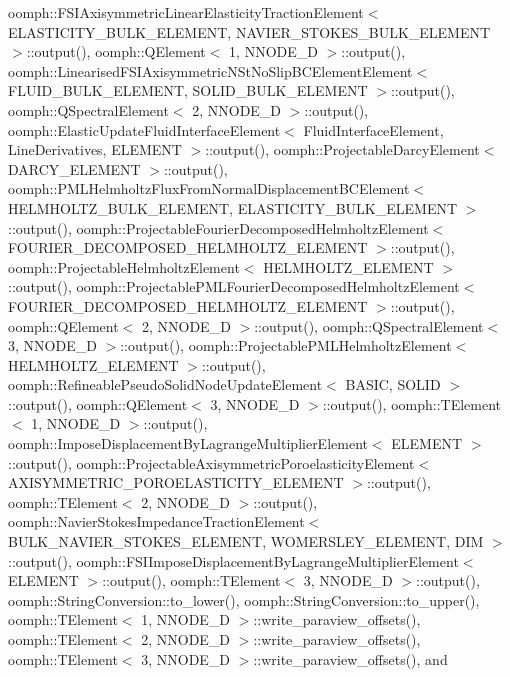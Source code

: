 oomph\+::\+F\+S\+I\+Axisymmetric\+Linear\+Elasticity\+Traction\+Element$<$ E\+L\+A\+S\+T\+I\+C\+I\+T\+Y\+\_\+\+B\+U\+L\+K\+\_\+\+E\+L\+E\+M\+E\+N\+T, N\+A\+V\+I\+E\+R\+\_\+\+S\+T\+O\+K\+E\+S\+\_\+\+B\+U\+L\+K\+\_\+\+E\+L\+E\+M\+E\+N\+T $>$\+::output(), oomph\+::\+Q\+Element$<$ 1, N\+N\+O\+D\+E\+\_\+D $>$\+::output(), oomph\+::\+Linearised\+F\+S\+I\+Axisymmetric\+N\+St\+No\+Slip\+B\+C\+Element\+Element$<$ F\+L\+U\+I\+D\+\_\+\+B\+U\+L\+K\+\_\+\+E\+L\+E\+M\+E\+N\+T, S\+O\+L\+I\+D\+\_\+\+B\+U\+L\+K\+\_\+\+E\+L\+E\+M\+E\+N\+T $>$\+::output(), oomph\+::\+Q\+Spectral\+Element$<$ 2, N\+N\+O\+D\+E\+\_\+D $>$\+::output(), oomph\+::\+Elastic\+Update\+Fluid\+Interface\+Element$<$ Fluid\+Interface\+Element, Line\+Derivatives, E\+L\+E\+M\+E\+N\+T $>$\+::output(), oomph\+::\+Projectable\+Darcy\+Element$<$ D\+A\+R\+C\+Y\+\_\+\+E\+L\+E\+M\+E\+N\+T $>$\+::output(), oomph\+::\+P\+M\+L\+Helmholtz\+Flux\+From\+Normal\+Displacement\+B\+C\+Element$<$ H\+E\+L\+M\+H\+O\+L\+T\+Z\+\_\+\+B\+U\+L\+K\+\_\+\+E\+L\+E\+M\+E\+N\+T, E\+L\+A\+S\+T\+I\+C\+I\+T\+Y\+\_\+\+B\+U\+L\+K\+\_\+\+E\+L\+E\+M\+E\+N\+T $>$\+::output(), oomph\+::\+Projectable\+Fourier\+Decomposed\+Helmholtz\+Element$<$ F\+O\+U\+R\+I\+E\+R\+\_\+\+D\+E\+C\+O\+M\+P\+O\+S\+E\+D\+\_\+\+H\+E\+L\+M\+H\+O\+L\+T\+Z\+\_\+\+E\+L\+E\+M\+E\+N\+T $>$\+::output(), oomph\+::\+Projectable\+Helmholtz\+Element$<$ H\+E\+L\+M\+H\+O\+L\+T\+Z\+\_\+\+E\+L\+E\+M\+E\+N\+T $>$\+::output(), oomph\+::\+Projectable\+P\+M\+L\+Fourier\+Decomposed\+Helmholtz\+Element$<$ F\+O\+U\+R\+I\+E\+R\+\_\+\+D\+E\+C\+O\+M\+P\+O\+S\+E\+D\+\_\+\+H\+E\+L\+M\+H\+O\+L\+T\+Z\+\_\+\+E\+L\+E\+M\+E\+N\+T $>$\+::output(), oomph\+::\+Q\+Element$<$ 2, N\+N\+O\+D\+E\+\_\+D $>$\+::output(), oomph\+::\+Q\+Spectral\+Element$<$ 3, N\+N\+O\+D\+E\+\_\+D $>$\+::output(), oomph\+::\+Projectable\+P\+M\+L\+Helmholtz\+Element$<$ H\+E\+L\+M\+H\+O\+L\+T\+Z\+\_\+\+E\+L\+E\+M\+E\+N\+T $>$\+::output(), oomph\+::\+Refineable\+Pseudo\+Solid\+Node\+Update\+Element$<$ B\+A\+S\+I\+C, S\+O\+L\+I\+D $>$\+::output(), oomph\+::\+Q\+Element$<$ 3, N\+N\+O\+D\+E\+\_\+D $>$\+::output(), oomph\+::\+T\+Element$<$ 1, N\+N\+O\+D\+E\+\_\+D $>$\+::output(), oomph\+::\+Impose\+Displacement\+By\+Lagrange\+Multiplier\+Element$<$ E\+L\+E\+M\+E\+N\+T $>$\+::output(), oomph\+::\+Projectable\+Axisymmetric\+Poroelasticity\+Element$<$ A\+X\+I\+S\+Y\+M\+M\+E\+T\+R\+I\+C\+\_\+\+P\+O\+R\+O\+E\+L\+A\+S\+T\+I\+C\+I\+T\+Y\+\_\+\+E\+L\+E\+M\+E\+N\+T $>$\+::output(), oomph\+::\+T\+Element$<$ 2, N\+N\+O\+D\+E\+\_\+D $>$\+::output(), oomph\+::\+Navier\+Stokes\+Impedance\+Traction\+Element$<$ B\+U\+L\+K\+\_\+\+N\+A\+V\+I\+E\+R\+\_\+\+S\+T\+O\+K\+E\+S\+\_\+\+E\+L\+E\+M\+E\+N\+T, W\+O\+M\+E\+R\+S\+L\+E\+Y\+\_\+\+E\+L\+E\+M\+E\+N\+T, D\+I\+M $>$\+::output(), oomph\+::\+F\+S\+I\+Impose\+Displacement\+By\+Lagrange\+Multiplier\+Element$<$ E\+L\+E\+M\+E\+N\+T $>$\+::output(), oomph\+::\+T\+Element$<$ 3, N\+N\+O\+D\+E\+\_\+D $>$\+::output(), oomph\+::\+String\+Conversion\+::to\+\_\+lower(), oomph\+::\+String\+Conversion\+::to\+\_\+upper(), oomph\+::\+T\+Element$<$ 1, N\+N\+O\+D\+E\+\_\+D $>$\+::write\+\_\+paraview\+\_\+offsets(), oomph\+::\+T\+Element$<$ 2, N\+N\+O\+D\+E\+\_\+D $>$\+::write\+\_\+paraview\+\_\+offsets(), oomph\+::\+T\+Element$<$ 3, N\+N\+O\+D\+E\+\_\+D $>$\+::write\+\_\+paraview\+\_\+offsets(), and 